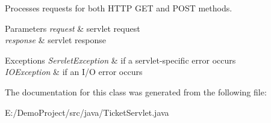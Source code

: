 Processes requests for both H\+T\+TP {\ttfamily G\+ET} and {\ttfamily P\+O\+ST} methods.


\begin{DoxyParams}{Parameters}
{\em request} & servlet request \\
\hline
{\em response} & servlet response \\
\hline
\end{DoxyParams}

\begin{DoxyExceptions}{Exceptions}
{\em Servlet\+Exception} & if a servlet-\/specific error occurs \\
\hline
{\em I\+O\+Exception} & if an I/O error occurs \\
\hline
\end{DoxyExceptions}


The documentation for this class was generated from the following file\+:\begin{DoxyCompactItemize}
\item 
E\+:/\+Demo\+Project/src/java/Ticket\+Servlet.\+java\end{DoxyCompactItemize}
